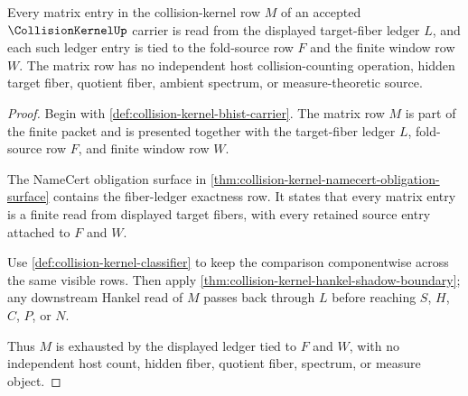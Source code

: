 \begin{theorem}
\label{thm:collision-kernel-fiber-ledger-exactness}
Every matrix entry in the collision-kernel row $M$ of an accepted $\CollisionKernelUp$ carrier is read from the displayed target-fiber ledger $L$, and each such ledger entry is tied to the fold-source row $F$ and the finite window row $W$. The matrix row has no independent host collision-counting operation, hidden target fiber, quotient fiber, ambient spectrum, or measure-theoretic source.
\end{theorem}
\begin{proof}
Begin with \autoref{def:collision-kernel-bhist-carrier}. The matrix row $M$ is part of the finite packet and is presented together with the target-fiber ledger $L$, fold-source row $F$, and finite window row $W$.

The NameCert obligation surface in \autoref{thm:collision-kernel-namecert-obligation-surface} contains the fiber-ledger exactness row. It states that every matrix entry is a finite read from displayed target fibers, with every retained source entry attached to $F$ and $W$.

Use \autoref{def:collision-kernel-classifier} to keep the comparison componentwise across the same visible rows. Then apply \autoref{thm:collision-kernel-hankel-shadow-boundary}; any downstream Hankel read of $M$ passes back through $L$ before reaching $S$, $H$, $C$, $P$, or $N$.

Thus $M$ is exhausted by the displayed ledger tied to $F$ and $W$, with no independent host count, hidden fiber, quotient fiber, spectrum, or measure object.
\end{proof}

